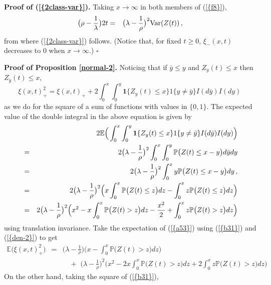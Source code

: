 \documentclass[reqno, 12pt]{amsart}
\begin{document}
{{\noindent \bf Proof of {{(\ref{{2class-var}})}}.}} Taking $x\to\infty$ in both members of {(\ref{{f8}})},
\begin{eqnarray}
  \label{f9}
  \big(\rho-\frac{1}{\lambda}\big)2t
  &=& \big(\lambda-\frac{1}{\rho}\big)^2{{\rm Var}}(Z(t))\,,\nonumber
\end{eqnarray}
from where {(\ref{{2class-var}})} follows. (Notice that, for fixed $t\geq 0$, $\xi_-(x,t)$ decreases to $0$ when $x\to\infty$.)  {$\square$ \vskip 2mm}

{{\noindent \bf Proof of {Proposition \ref{normal-2}}.}} Noticing that if $\bar{y}\leq y$ and
$Z_y(t)\leq x$ then $Z_{\bar{y}}(t)\leq x$,
\begin{equation}
  \label{a53}
  \xi(x,t)_+^2=\xi(x,t)_+ + 2\int_0^x\int_0^y{{\mathbf 1}}\{Z_y(t)\leq
x\}1\{y\neq \bar y\}I(d\bar{y})I(dy)\,
\end{equation}
as we do for the square of a sum of functions with values in $\{0,1\}$. The
expected value of the double integral in the above equation is given by
\begin{eqnarray}
  \label{a20}
  && \hskip-2cm 2{{\mathbb E}}\Big(\int_0^x\int_0^y{{\mathbf 1}}\{Z_y(t)\leq
  x\}1\{y\neq \bar y\}I(d\bar{y})I(dy)\Big)\nonumber\\
  &=&2\big(\lambda-\frac{1}{\rho}\big)^2\int_0^x\int_0^y{{\mathbb P}}\big(Z(t)\leq
  x-y\big)d\bar{y}dy\nonumber\\
\label{den-2}
&=&2\big(\lambda-\frac{1}{\rho}\big)^2\int_0^x y{{\mathbb P}}\big(Z(t)\leq
x-y\big)dy\,,\nonumber\\
&=&2\big(\lambda-\frac{1}{\rho}\big)^2\Big(x\int_0^x
{{\mathbb P}}\big(Z(t)\le z\big)dz -\int_0^x z{{\mathbb P}} \big(Z(t)\le z\big)dz \Big)\nonumber\\
&=&2\big(\lambda-\frac{1}{\rho}\big)^2\Big(x^2-x\int_0^x
{{\mathbb P}}\big(Z(t)> z\big)dz -\frac{x^2}{2}+\int_0^x z
{{\mathbb P}}\big(Z(t)> z\big)dz \Big)\end{eqnarray}
using translation invariance. Take the expectation of {(\ref{{a53}})} using
{(\ref{{b31}})} and {(\ref{{den-2}})} to get
\begin{eqnarray}
  \label{f5}
  {{\mathbb E}}\big(\xi(x,t)_+^2\big)
  &=&\big(\lambda-\frac{1}{\rho}\big)\Big(x-\int_0^x{{\mathbb P}}\big(Z(t)>z\big)dz\Big)\\
  &&\quad+\,\,\big(\lambda-\frac{1}{\rho}\big)^2\Big(x^2-2x\int_0^x
  {{\mathbb P}}\big(Z(t)> z\big)dz +2\int_0^x z
  {{\mathbb P}}\big(Z(t)> z\big)dz \Big)\nonumber
\end{eqnarray}
On the other hand, taking the square of {(\ref{{b31}})},
\end{document}
